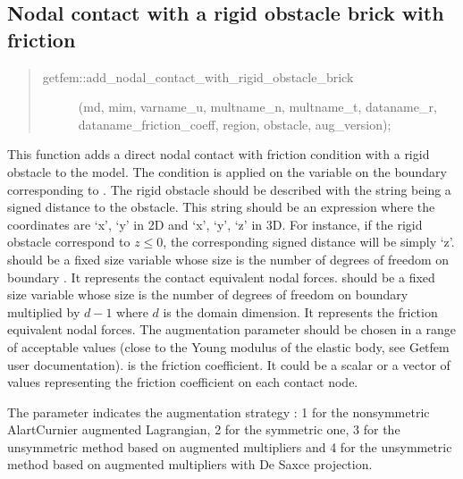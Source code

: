 \documentclass[a4paper,11pt,english]{sphinxmanual}
\begin{document}
\subsection{Nodal contact with a rigid obstacle brick with friction}
\label{\detokenize{userdoc/model_contact_friction:nodal-contact-with-a-rigid-obstacle-brick-with-friction}}\begin{quote}
\begin{description}
\item[{getfem::add\_nodal\_contact\_with\_rigid\_obstacle\_brick}] \leavevmode
(md, mim, varname\_u, multname\_n, multname\_t, dataname\_r,
dataname\_friction\_coeff, region, obstacle, aug\_version);

\end{description}
\end{quote}

This function adds a direct nodal contact with friction condition with a rigid
obstacle to the model. The condition is applied on the variable 
on the boundary corresponding to . The rigid obstacle should
be described with the string  being a signed distance to
the obstacle. This string should be an expression where the coordinates
are ‘x’, ‘y’ in 2D and ‘x’, ‘y’, ‘z’ in 3D. For instance, if the rigid
obstacle correspond to \(z \le 0\), the corresponding signed distance will
be simply ‘z’.  should be a fixed size variable whose size is
the number of degrees of freedom on boundary . It represents the
contact equivalent nodal forces.
 should be a fixed size variable whose size is
the number of degrees of freedom on boundary  multiplied by
\(d-1\) where \(d\) is the domain dimension. It represents the
friction equivalent nodal forces.
The augmentation parameter  should be chosen in a
range of acceptable values (close to the Young modulus of the elastic
body, see Getfem user documentation).  is
the friction coefficient. It could be a scalar or a vector of values
representing the friction coefficient on each contact node.

The parameter  indicates the augmentation strategy :
1 for the non\sphinxhyphen{}symmetric Alart\sphinxhyphen{}Curnier augmented Lagrangian,
2 for the symmetric one,
3 for the unsymmetric method based on augmented multipliers and
4 for the unsymmetric method based on augmented multipliers with De Saxce projection.
\end{document}
